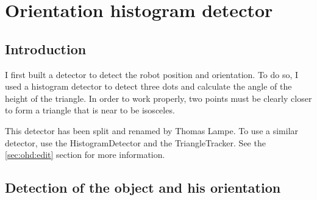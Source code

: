 \section[Orientation histogram detector (Triangle tracker)]{Orientation histogram detector}
\label{sec:ohd}

\subsection{Introduction}
\label{sec:ohd:intro}


    I first built a detector to detect the robot position and orientation. 
    To do so, I used a histogram detector to detect three dots and calculate
    the angle of the height of the triangle. In order to work properly, two 
    points must be clearly closer to form a triangle that is near to be 
    isosceles.

    This detector has been split and renamed by Thomas Lampe. 
    To use a similar detector, 
    use the HistogramDetector and the 
    TriangleTracker. See the \ref{sec:ohd:edit} section for more 
    information.

\subsection{Detection of the object and his orientation}

